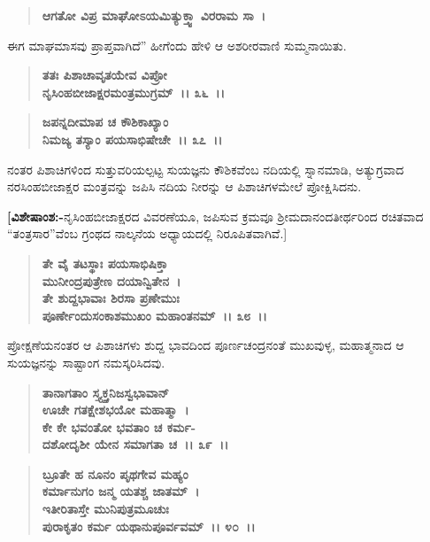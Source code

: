 \begin{verse}
\textbf{ಆಗತೋ ವಿಪ್ರ ಮಾಘೋಽಯಮಿತ್ಯುಕ್ತ್ವಾ ವಿರರಾಮ ಸಾ~।}
\end{verse}

ಈಗ ಮಾಘಮಾಸವು ಪ್ರಾಪ್ತವಾಗಿದೆ” ಹೀಗೆಂದು ಹೇಳಿ ಆ ಅಶರೀರವಾಣಿ ಸುಮ್ಮನಾಯಿತು.

\begin{verse}
\textbf{ತತಃ ಪಿಶಾಚಾವೃತಯೇವ ವಿಪ್ರೋ}\\\textbf{ನೃಸಿಂಹಬೀಜಾಕ್ಷರಮಂತ್ರಮುಗ್ರಮ್~।। ೩೬~।।} 
\end{verse}

\begin{verse}
\textbf{ಜಪನ್ನದೀಮಾಪ ಚ ಕೌಶಿಕಾಖ್ಯಾಂ}\\\textbf{ನಿಮಜ್ಯ ತಸ್ಯಾಂ ಪಯಸಾಭಿಷೇಚೇ~।। ೩೭~।।}
\end{verse}

ನಂತರ ಪಿಶಾಚಿಗಳಿಂದ ಸುತ್ತುವರಿಯಲ್ಪಟ್ಟ ಸುಯಜ್ಞನು ಕೌಶಿಕವೆಂಬ ನದಿಯಲ್ಲಿ ಸ್ನಾನಮಾಡಿ, ಅತ್ಯುಗ್ರವಾದ ನರಸಿಂಹಬೀಜಾಕ್ಷರ ಮಂತ್ರವನ್ನು ಜಪಿಸಿ ನದಿಯ ನೀರನ್ನು ಆ ಪಿಶಾಚಿಗಳಮೇಲೆ ಪ್ರೋಕ್ಷಿಸಿದನು.

\textbf{[ವಿಶೇಷಾಂಶ:-}ನೃಸಿಂಹಬೀಜಾಕ್ಷರದ ವಿವರಣೆಯೂ, ಜಪಿಸುವ ಕ್ರಮವೂ ಶ‍್ರೀಮದಾನಂದ\-ತೀರ್ಥರಿಂದ ರಚಿತವಾದ “ತಂತ್ರಸಾರ”ವೆಂಬ ಗ್ರಂಥದ ನಾಲ್ಕನೆಯ ಅಧ್ಯಾಯದಲ್ಲಿ ನಿರೂಪಿತವಾಗಿವೆ.]

\begin{verse}
\textbf{ತೇ ವೈ ತಟಸ್ಥಾಃ ಪಯಸಾಭಿಷಿಕ್ತಾ} \\\textbf{ಮುನೀಂದ್ರಪುತ್ರೇಣ ದಯಾನ್ವಿತೇನ~।}\\\textbf{ತೇ ಶುದ್ದಭಾವಾಃ ಶಿರಸಾ ಪ್ರಣೇಮುಃ} \\\textbf{ಪೂರ್ಣೇಂದುಸಂಕಾಶಮುಖಂ ಮಹಾಂತನಮ್~।। ೩೮~।।}
\end{verse}

ಪ್ರೋಕ್ಷಣೆಯನಂತರ ಆ ಪಿಶಾಚಿಗಳು ಶುದ್ದ ಭಾವದಿಂದ ಪೂರ್ಣಚಂದ್ರನಂತೆ ಮುಖವುಳ್ಳ, ಮಹಾತ್ಮನಾದ ಆ ಸುಯಜ್ಞನನ್ನು ಸಾಷ್ಟಾಂಗ ನಮಸ್ಕರಿಸಿದವು.

\begin{verse}
\textbf{ತಾನಾಗತಾಂ ಸ್ತ್ಯ್ತಕ್ತನಿಜಸ್ವಭಾವಾನ್} \\\textbf{ಊಚೇ ಗತಕ್ಷೇಶಭಯೋ ಮಹಾತ್ಮಾ~।}\\\textbf{ಕೇ ಕೇ ಭವಂತೋ ಭವತಾಂ ಚ ಕರ್ಮ-} \\\textbf{ದಶೋದೃಶೀ ಯೇನ ಸಮಾಗತಾ ಚ~।। ೩೯~।। }
\end{verse}

\begin{verse}
\textbf{ಬ್ರೂತೇ ಹ ನೂನಂ ಪೃಥಗೇವ ಮಹ್ಯಂ} \\\textbf{ಕರ್ಮಾನುಗಂ ಜನ್ಮ ಯತಶ್ಚ ಜಾತಮ್~।}\\\textbf{ಇತೀರಿತಾಸ್ತೇ ಮುನಿಪುತ್ರಮೂಚುಃ} \\\textbf{ಪುರಾಕೃತಂ ಕರ್ಮ ಯಥಾನುಪೂರ್ವವಮ್~।। ೪೦~।।}
\end{verse}

